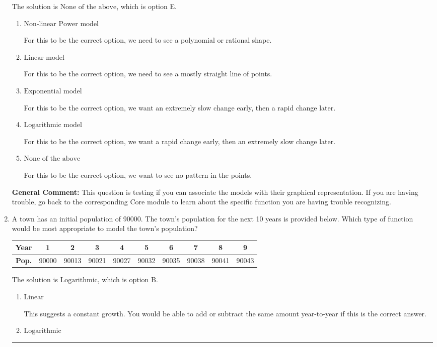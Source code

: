 \documentclass{extbook}[14pt]
\newcommand{\litem}[1]{\item #1

\rule{\textwidth}{0.4pt}}
\begin{document}
\begin{enumerate}
{The solution is \( \text{None of the above} \), which is option E.\begin{enumerate}[label=\Alph*.]
\item \( \text{Non-linear Power model} \)

For this to be the correct option, we need to see a polynomial or rational shape.
\item \( \text{Linear model} \)

For this to be the correct option, we need to see a mostly straight line of points.
\item \( \text{Exponential model} \)

For this to be the correct option, we want an extremely slow change early, then a rapid change later.
\item \( \text{Logarithmic model} \)

For this to be the correct option, we want a rapid change early, then an extremely slow change later.
\item \( \text{None of the above} \)

For this to be the correct option, we want to see no pattern in the points.
\end{enumerate}

\textbf{General Comment:} This question is testing if you can associate the models with their graphical representation. If you are having trouble, go back to the corresponding Core module to learn about the specific function you are having trouble recognizing.
}
\litem{
A town has an initial population of 90000. The town's population for the next 10 years is provided below. Which type of function would be most appropriate to model the town's population?



\begin{tabular}{c|c|c|c|c|c|c|c|c|c}
\textbf{Year} & 1 & 2 & 3 & 4 & 5 & 6 & 7 & 8 & 9 \tabularnewline
\hline
\textbf{Pop.} & 90000 & 90013 & 90021 & 90027 & 90032 & 90035 & 90038 & 90041 & 90043
\end{tabular} 

The solution is \( \text{Logarithmic} \), which is option B.\begin{enumerate}[label=\Alph*.]
\item \( \text{Linear} \)

This suggests a constant growth. You would be able to add or subtract the same amount year-to-year if this is the correct answer.
\item \( \text{Logarithmic} \)


\end{enumerate}}
\end{enumerate}
\end{document}
